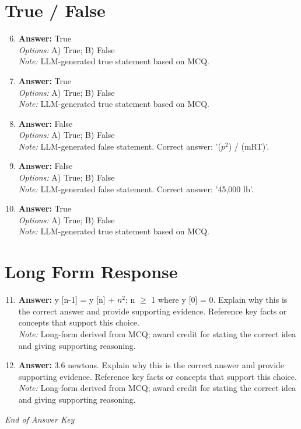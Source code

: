 \documentclass[12pt]{article}
\begin{document}
\section*{True / False}
\begin{enumerate}[label=\arabic*.]
\setcounter{enumi}{5}
\item \textbf{Answer:} True
\\ \textit{Options:} A) True; B) False
\\ \textit{Note:} LLM-generated true statement based on MCQ.
\item \textbf{Answer:} True
\\ \textit{Options:} A) True; B) False
\\ \textit{Note:} LLM-generated true statement based on MCQ.
\item \textbf{Answer:} False
\\ \textit{Options:} A) True; B) False
\\ \textit{Note:} LLM-generated false statement. Correct answer: '($p^2$) / (mRT)'.
\item \textbf{Answer:} False
\\ \textit{Options:} A) True; B) False
\\ \textit{Note:} LLM-generated false statement. Correct answer: '45,000 lb'.
\item \textbf{Answer:} True
\\ \textit{Options:} A) True; B) False
\\ \textit{Note:} LLM-generated true statement based on MCQ.
\end{enumerate}

\section*{Long Form Response}
\begin{enumerate}[label=\arabic*.]
\setcounter{enumi}{10}
\item \textbf{Answer:} y [n-1] = y [n] + $n^2$; n \ensuremath{\geq} 1 where y [0] = 0. Explain why this is the correct answer and provide supporting evidence. Reference key facts or concepts that support this choice.
\\ \textit{Note:} Long-form derived from MCQ; award credit for stating the correct idea and giving supporting reasoning.
\item \textbf{Answer:} 3.6 newtons. Explain why this is the correct answer and provide supporting evidence. Reference key facts or concepts that support this choice.
\\ \textit{Note:} Long-form derived from MCQ; award credit for stating the correct idea and giving supporting reasoning.
\end{enumerate}

\vfill
\noindent\textit{End of Answer Key}
\end{document}
